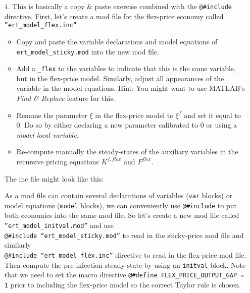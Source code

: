 \begin{itemize}
\item[4.] This is basically a copy \& paste exercise combined with the \texttt{@\#include} directive.
First, let's create a mod file for the flex-price economy called \texttt{''ert\_model\_flex.inc''}
\begin{itemize}
    \item Copy and paste the variable declarations and model equations of \texttt{ert\_model\_sticky.mod} into the new mod file.
    \item Add a \texttt{\_flex} to the variables to indicate that this is the same variable,
      but in the flex-price model.
    Similarly, adjust all appearances of the variable in the model equations.
    Hint: You might want to use MATLAB's \emph{Find \& Replace} feature for this.
    \item Rename the parameter \(\xi \) in the flex-price model to \(\xi^f\) and set it equal to 0.
    Do so by either declaring a new parameter calibrated to 0 or using a \emph{model local variable.}
    \item Re-compute manually the steady-states of the auxiliary variables in the recursive pricing equations \(K^{f,flex}\) and \(F^{flex}\).
\end{itemize}
The inc file might look like this:

As a mod file can contain several declarations of variables (\texttt{var} blocks) or model equations (\texttt{model} blocks),
  we can conveniently use \texttt{@\#include} to put both economies into the same mod file.
So let's create a new mod file called \texttt{''ert\_model\_initval.mod''}
  and use\\ \texttt{@\#include ``ert\_model\_sticky.mod''} to read in the sticky-price mod file
  and similarly\\\texttt{@\#include ``ert\_model\_flex.inc''} directive to read in the flex-price mod file.
Then compute the pre-infection steady-state by using an \texttt{initval} block.
Note that we need to set the macro directive \texttt{@\#define FLEX\_PRICE\_OUTPUT\_GAP = 1}
  prior to including the flex-price model so the correct Taylor rule is chosen.



\end{itemize}
